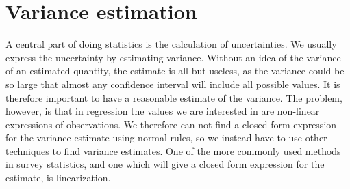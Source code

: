 \documentclass{article}
\begin{document}
\section{Variance estimation} \label{sec:VarEst}

A central part of doing statistics is the calculation of uncertainties. We
usually express the uncertainty by estimating variance. Without an idea of the
variance of an estimated quantity, the estimate is all but useless, as the variance
could be so large that almost any confidence interval will include all possible
values. It is therefore important to have a reasonable estimate of the
variance. The problem, however, is that in regression the values we are
interested in are non-linear expressions of observations. We therefore can not find a closed form
expression for the variance estimate using normal rules, so we instead have to
use other techniques to
find variance estimates. One of the more commonly used methods in survey
statistics, and one which will give a closed form expression for the estimate,
is linearization.
\end{document}
